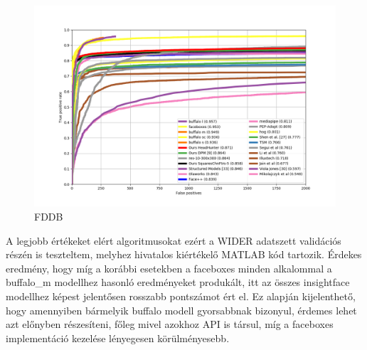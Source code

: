 \begin{figure}
    \centering
    \includegraphics[width=\linewidth]{figures/fddb.png}
    \caption{FDDB}
    \label{fig:fddb_evaluation}
\end{figure}

A legjobb értékeket elért algoritmusokat ezért a WIDER adatszett validációs részén is teszteltem, melyhez hivatalos kiértékelő MATLAB kód tartozik. Érdekes eredmény, hogy míg a korábbi esetekben a faceboxes minden alkalommal a buffalo\_m modellhez hasonló eredményeket produkált, itt az összes insightface modellhez képest jelentősen rosszabb pontszámot ért el. Ez alapján kijelenthető, hogy amennyiben bármelyik buffalo modell gyorsabbnak bizonyul, érdemes lehet azt előnyben részesíteni, főleg mivel azokhoz API is társul, míg a faceboxes implementáció kezelése lényegesen körülményesebb.

